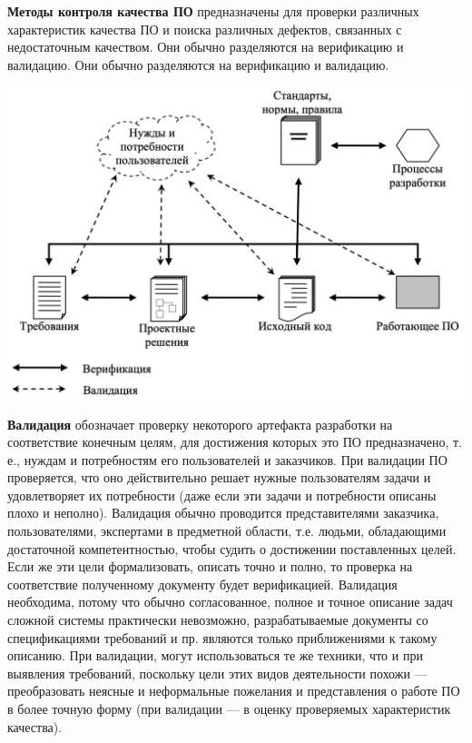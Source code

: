 
\textbf{Методы контроля качества ПО} предназначены для проверки различных характеристик качества ПО и поиска различных дефектов, связанных с недостаточным качеством. Они обычно разделяются на верификацию и валидацию. Они обычно разделяются на верификацию и валидацию.

\includegraphics[scale=0.27]{pics/12_01.png}

\textbf{Валидация} обозначает проверку некоторого артефакта разработки на соответствие конечным целям, для достижения которых это ПО предназначено, т. е., нуждам и потребностям его пользователей и заказчиков. При валидации ПО проверяется, что оно действительно решает нужные пользователям задачи и удовлетворяет их потребности (даже если эти задачи и потребности описаны плохо и неполно). Валидация обычно проводится представителями заказчика, пользователями, экспертами в предметной области, т.е. людьми, обладающими достаточной компетентностью, чтобы судить о достижении поставленных целей. Если же эти цели формализовать, описать точно и полно, то проверка на соответствие полученному документу будет верификацией. Валидация необходима, потому что обычно согласованное, полное и точное описание задач сложной системы практически невозможно, разрабатываемые документы со спецификациями требований и пр. являются только приближениями к такому описанию. При валидации, могут использоваться те же техники, что и при выявления требований, поскольку цели этих видов деятельности похожи — преобразовать неясные и неформальные пожелания и представления о работе ПО в более точную форму (при валидации — в оценку проверяемых характеристик качества).


